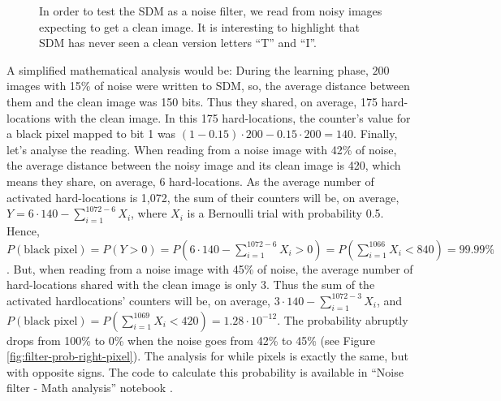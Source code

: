 \begin{figure}[!htb]


  \caption{In order to test the SDM as a noise filter, we read from noisy images expecting to get a clean image. It is interesting to highlight that SDM has never seen a clean version letters ``T'' and ``I''.
  \label{fig:filter-testing}
  }
\end{figure}

A simplified mathematical analysis would be: During the learning phase, $200$ images with 15\% of noise were written to SDM, so, the average distance between them and the clean image was 150 bits. Thus they shared, on average, 175 hard-locations with the clean image. In this 175 hard-locations, the counter's value for a black pixel mapped to bit 1 was $(1-0.15) \cdot 200 - 0.15 \cdot 200 = 140$. Finally, let's analyse the reading. When reading from a noise image with 42\% of noise, the average distance between the noisy image and its clean image is 420, which means they share, on average, 6 hard-locations. As the average number of activated hard-locations is 1,072, the sum of their counters will be, on average, $Y = 6 \cdot 140 - \sum_{i=1}^{1072-6} X_i$, where $X_i$ is a Bernoulli trial with probability 0.5. Hence, $P(\text{black pixel}) = P(Y > 0) = P(6 \cdot 140 - \sum_{i=1}^{1072-6} X_i > 0) = P(\sum_{i=1}^{1066} X_i < 840) = 99.99\%$. But, when reading from a noise image with 45\% of noise, the average number of hard-locations shared with the clean image is only 3. Thus the sum of the activated hardlocations' counters will be, on average, $3 \cdot 140 - \sum_{i=1}^{1072-3} X_i$, and $P(\text{black pixel}) = P(\sum_{i=1}^{1069} X_i < 420) = 1.28 \cdot 10^{-12}$. The probability abruptly drops from 100\% to 0\% when the noise goes from 42\% to 45\% (see Figure \ref{fig:filter-prob-right-pixel}). The analysis for while pixels is exactly the same, but with opposite signs. The code to calculate this probability is available in ``Noise filter - Math analysis'' notebook \citep{sdmframework}.

